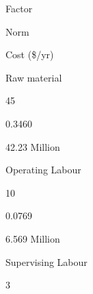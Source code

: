 \documentclass[a4paper,portrait,12pt]{article}
\begin{document}
\begin{flushleft}
Factor
\end{flushleft}





\begin{flushleft}
Norm
\end{flushleft}





\begin{flushleft}
Cost (\$/yr)
\end{flushleft}





\begin{flushleft}
Raw material
\end{flushleft}





45





0.3460





\begin{flushleft}
42.23 Million
\end{flushleft}





\begin{flushleft}
Operating Labour
\end{flushleft}





10





0.0769





\begin{flushleft}
6.569 Million
\end{flushleft}





\begin{flushleft}
Supervising Labour
\end{flushleft}





3
\end{document}
